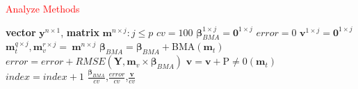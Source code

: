 \documentclass[journal=jpcbfk, manuscript=article]{achemso}
\newcommand{\+}[1]{\ensuremath{\mathbf{#1}}}
\newcommand{\rev}[1]{\textsf{\textcolor{red}{#1}}}
\begin{document}
\begin{table}[t]
\begin{minipage}[t]{0.45\linewidth}
		\centering
		\begin{algorithm}[H] 
			\footnotesize 
			\caption{\newline \rev{Analyze Methods}} \label{Method:Alg2} 
			\begin{algorithmic}[1] 
				{\scriptsize 
				\REQUIRE  \textbf{vector} $\textbf{y}^{n \times 1}$, \textbf{matrix} $\textbf{m}^{n \times j}: j \leq p$\; 
				\vspace{2.5mm} 
				\STATE $cv = 100$\; \; 
				\STATE $\boldsymbol{{\beta}}_{BMA}^{1 \times j} = \textbf{0}^{1 \times j}$ \; 
				\STATE $error = 0$ \; 
				\STATE $\textbf{v}^{1 \times j} = \textbf{0}^{1 \times j}$ \;  
				\; 
					\STATE $\textbf{m}_{t}^{q \times j}, \textbf{m}_{v}^{r \times j} =\ \textbf{m}^{n \times j}$\;
					\; 
					\STATE $\boldsymbol{\beta}_{BMA} = \boldsymbol{\beta}_{BMA} + $BMA$(\textbf{m}_{t})$ \; 
					\STATE $error = error + RMSE(\textbf{Y}, \textbf{m}_{v} \times \boldsymbol{\beta}_{BMA})$\; 
					\STATE $\textbf{v} = \textbf{v} + $P$\neq$0$(\textbf{m}_{t})$ \; 
					\STATE $index = index + 1$ 
				\ENDWHILE\; 
				\RETURN $\frac{\boldsymbol{\beta}_{BMA}}{cv}$,$\frac{error}{cv}$,$\frac{\textbf{v}}{cv}$\; } 
			\end{algorithmic}
		\end{algorithm} 
	\end{minipage}
\end{table}
\end{document}
